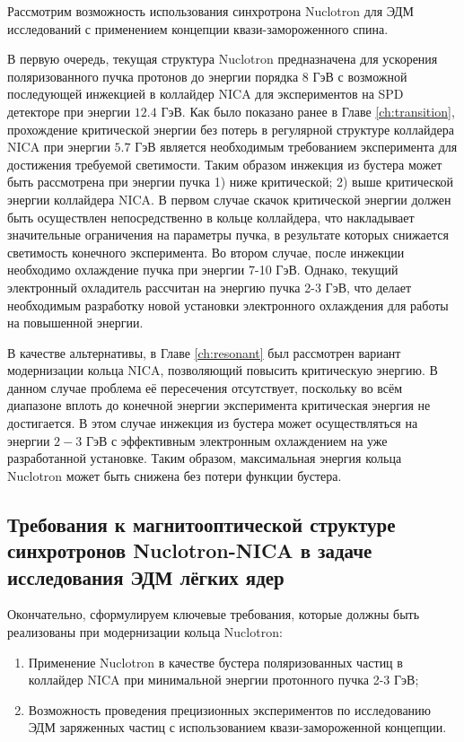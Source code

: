 \par Рассмотрим возможность использования синхротрона Nuclotron для ЭДМ исследований с применением концепции квази-замороженного спина.
\par В первую очередь, текущая структура Nuclotron предназначена для ускорения поляризованного пучка протонов до энергии порядка $8$ ГэВ с возможной последующей инжекцией в коллайдер NICA для экспериментов на SPD детекторе при энергии $12.4$ ГэВ. Как было показано ранее в Главе \ref{ch:transition}, прохождение критической энергии без потерь в регулярной структуре коллайдера NICA при энергии $5.7$ ГэВ является необходимым требованием эксперимента для достижения требуемой светимости. Таким образом инжекция из бустера может быть рассмотрена при энергии пучка 1) ниже критической; 2) выше критической энергии коллайдера NICA. В первом случае скачок критической энергии должен быть осуществлен непосредственно в кольце коллайдера, что накладывает значительные ограничения на параметры пучка, в результате которых снижается светимость конечного эксперимента. Во втором случае, после инжекции необходимо охлаждение пучка при энергии 7-10 ГэВ. Однако, текущий электронный охладитель рассчитан на энергию пучка 2-3 ГэВ, что делает необходимым разработку новой установки электронного охлаждения для работы на повышенной энергии.

\par В качестве альтернативы, в Главе \ref{ch:resonant} был рассмотрен вариант модернизации кольца NICA, позволяющий повысить критическую энергию. В данном случае проблема её пересечения отсутствует, поскольку во всём диапазоне вплоть до конечной энергии эксперимента критическая энергия не достигается. В этом случае инжекция из бустера может осуществляться на энергии $2-3$ ГэВ с эффективным электронным охлаждением на уже разработанной установке. Таким образом, максимальная энергия кольца Nuclotron может быть снижена без потери функции бустера.

	\subsection{Требования к магнитооптической структуре синхротронов Nuclotron-NICA в задаче исследования ЭДМ лёгких ядер}\label{sec:EDM/requirements}

Окончательно, сформулируем ключевые требования, которые должны быть реализованы при модернизации кольца Nuclotron:

\begin{enumerate}
    \item Применение Nuclotron в качестве бустера поляризованных частиц в коллайдер NICA при минимальной энергии протонного пучка 2-3 ГэВ;
    \item Возможность проведения прецизионных экспериментов по исследованию ЭДМ заряженных частиц с использованием квази-замороженной концепции.
\end{enumerate}

